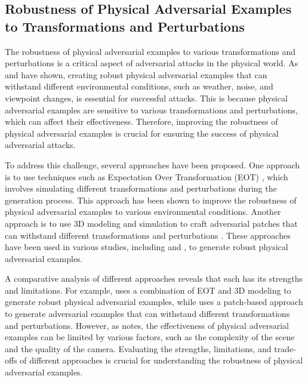 \documentclass[11pt,a4paper]{article}
\begin{document}
\subsection{Robustness of Physical Adversarial Examples to Transformations and Perturbations}


The robustness of physical adversarial examples to various transformations and perturbations is a critical aspect of adversarial attacks in the physical world. As \cite{arxiv:1707.07397} and \cite{arxiv:1707.08945} have shown, creating robust physical adversarial examples that can withstand different environmental conditions, such as weather, noise, and viewpoint changes, is essential for successful attacks. This is because physical adversarial examples are sensitive to various transformations and perturbations, which can affect their effectiveness. Therefore, improving the robustness of physical adversarial examples is crucial for ensuring the success of physical adversarial attacks.

To address this challenge, several approaches have been proposed. One approach is to use techniques such as Expectation Over Transformation (EOT) \cite{arxiv:1707.08945}, which involves simulating different transformations and perturbations during the generation process. This approach has been shown to improve the robustness of physical adversarial examples to various environmental conditions. Another approach is to use 3D modeling and simulation to craft adversarial patches that can withstand different transformations and perturbations \cite{doi:10.1016/j.neucom.2022.05.031}. These approaches have been used in various studies, including \cite{doi:10.1007/978-3-030-10925-7_4} and \cite{arxiv:1906.11897}, to generate robust physical adversarial examples.

A comparative analysis of different approaches reveals that each has its strengths and limitations. For example, \cite{doi:10.1007/978-3-030-10925-7_4} uses a combination of EOT and 3D modeling to generate robust physical adversarial examples, while \cite{arxiv:1906.11897} uses a patch-based approach to generate adversarial examples that can withstand different transformations and perturbations. However, as \cite{arxiv:1707.03501} notes, the effectiveness of physical adversarial examples can be limited by various factors, such as the complexity of the scene and the quality of the camera. Evaluating the strengths, limitations, and trade-offs of different approaches is crucial for understanding the robustness of physical adversarial examples.
\end{document}
